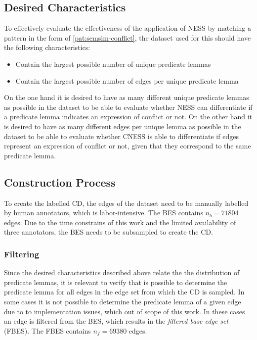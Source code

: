 \documentclass[11pt]{scrreprt}
\begin{document}

\subsection{Desired Characteristics}
\label{sec:dataset-characteristics}
To effectively evaluate the effectiveness of the application of NESS by matching a pattern in the form of \cref{pat:semsim-conflict}, the dataset used for this should have the following characteristics:

\begin{itemize}
	\item Contain the largest possible number of unique predicate lemmas
	\item Contain the largest possible number of edges per unique predicate lemma
\end{itemize}

On the one hand it is desired to have as many different unique predicate lemmas as possible in the dataset to be able to evaluate whether NESS can differentiate if a predicate lemma indicates an expression of conflict or not. On the other hand it is desired to have as many different edges per unique lemma as possible in the dataset to be able to evaluate whether CNESS is able to differentiate if edges represent an expression of conflict or not, given that they correspond to the same predicate lemma.

\subsection{Construction Process}
To create the labelled CD, the edges of the dataset need to be manually labelled by human annotators, which is labor-intensive. The BES contains \(n_b=71804\) edges. Due to the time constrains of this work and the limited availability of three annotators, the BES needs to be subsampled to create the CD. 

\subsubsection{Filtering}
Since the desired characteristics described above relate the the distribution of predicate lemmas, it is relevant to verify that is possible to determine the predicate lemma for all edges in the edge set from which the CD is sampled. In some cases it is not possible to determine the predicate lemma of a given edge due to to implementation issues, which out of scope of this work. In these cases an edge is filtered from the BES, which results in the \textit{filtered base edge set} (FBES). The FBES contains \(n_{f} = 69 380\) edges. 
\end{document}
